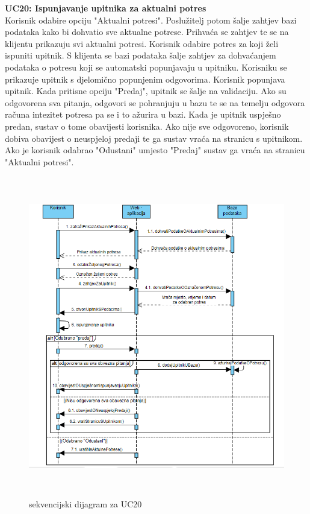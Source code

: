 			 
			\textbf{UC20: Ispunjavanje upitnika za aktualni potres}\\
			{Korisnik odabire opciju "Aktualni potresi". Poslužitelj potom šalje zahtjev bazi podataka kako bi dohvatio sve aktualne potrese. Prihvaća se zahtjev te se na klijentu prikazuju svi aktualni potresi. Korisnik odabire potres za koji želi ispuniti upitnik. S klijenta se bazi podataka šalje zahtjev za dohvaćanjem podataka o potresu koji se automatski popunjavaju u upitniku. Korisniku se prikazuje upitnik s djelomično popunjenim odgovorima. Korisnik popunjava upitnik. Kada pritisne opciju "Predaj", upitnik se šalje na validaciju. Ako su odgovorena sva pitanja, odgovori se pohranjuju u bazu te se na temelju odgovora računa intezitet potresa pa se i to ažurira u bazi. 
			Kada je upitnik uspješno predan, sustav o tome obavijesti korisnika. Ako nije sve odgovoreno, korisnik dobiva obavijest o neuspjeloj predaji te ga sustav vraća na stranicu s upitnikom. Ako je korisnik odabrao "Odustani" umjesto "Predaj" sustav ga vraća na stranicu "Aktualni potresi".}
			\begin{figure}[H]
				  \includegraphics[width=\textwidth, height=14cm]{slike/uc20.PNG}
				  \caption{sekvencijski dijagram za UC20}
				  \label{fig:sekvuc8} 
				 \end{figure}
				\eject
	
